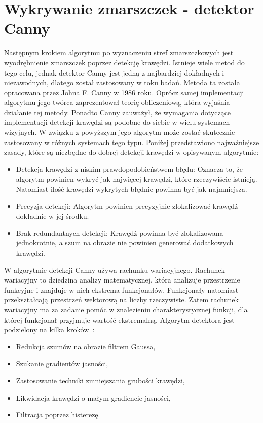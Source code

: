 \documentclass[a4paper,twoside,12pt]{book}
\begin{document}
    \section{Wykrywanie zmarszczek - detektor Canny}\label{sec:wykrywanie-zmarszczek---detektor-canny}
    Następnym krokiem algorytmu po wyznaczeniu stref zmarszczkowych jest wyodrębnienie zmarszczek poprzez detekcję
    krawędzi.
    Istnieje wiele metod do tego celu,
    jednak detektor Canny jest jedną z najbardziej dokładnych i niezawodnych, dlatego został zastosowany w toku badań.
    Metoda ta została opracowana przez Johna F. Canny w 1986 roku.
    Oprócz samej implementacji algorytmu jego twórca zaprezentował teorię obliczeniową,
    która wyjaśnia działanie tej metody. Ponadto Canny zauważył,
    że wymagania dotyczące implementacji detekcji krawędzi są podobne do siebie w wielu systemach wizyjnych.
    W związku z powyższym jego algorytm może zostać skutecznie zastosowany w różnych systemach tego typu.
    Poniżej przedstawiono najważniejsze zasady,
    które są niezbędne do dobrej detekcji krawędzi w opisywanym algorytmie:
    \begin{itemize}
        \item Detekcja krawędzi z niskim prawdopodobieństwem błędu:
        Oznacza to, że algorytm powinien wykryć jak najwięcej krawędzi, które rzeczywiście istnieją.
        Natomiast ilość krawędzi wykrytych błędnie powinna być jak najmniejsza.
        \item Precyzja detekcji: Algorytm powinien precyzyjnie zlokalizować krawędź dokładnie w jej środku.
        \item Brak redundantnych detekcji:
        Krawędź powinna być zlokalizowana jednokrotnie,
        a szum na obrazie nie powinien generować dodatkowych krawędzi.
    \end{itemize}
    W algorytmie detekcji Canny używa rachunku wariacyjnego.
    Rachunek wariacyjny to dziedzina analizy matematycznej, która
    analizuje przestrzenie funkcyjne i znajduje w nich ekstrema funkcjonałów.
    Funkcjonały natomiast przekształcają przestrzeń wektorową na liczby rzeczywiste.
    Zatem rachunek wariacyjny ma za zadanie pomóc w znalezieniu charakterystycznej funkcji,
    dla której funkcjonał przyjmuje wartość ekstremalną.
    Algorytm detektora jest podzielony na kilka kroków~\cite{Canny}:
    \begin{itemize}
        \item Redukcja szumów na obrazie filtrem Gaussa,
        \item Szukanie gradientów jasności,
        \item Zastosowanie techniki zmniejszania grubości krawędzi,
        \item Likwidacja krawędzi o małym gradiencie jasności,
        \item Filtracja poprzez histerezę.
    \end{itemize}
\end{document}
